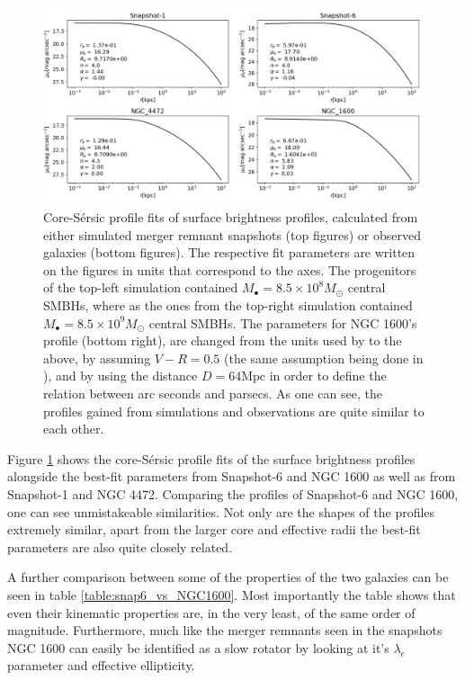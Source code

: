 \documentclass[english, oneside]{HYgradu}
\begin{document}
\begin{figure}[h]
	\centering
	\includegraphics[width=\textwidth]{core_sersic_fits_obs_and_sim.png}
	\caption{Core-Sérsic profile fits of surface brightness profiles, calculated from either simulated merger remnant snapshots (top figures) or observed galaxies (bottom figures). The respective fit parameters are written on the figures in units that correspond to the axes. The progenitors of the top-left simulation contained $M_\bullet = 8.5 \times 10^8 M_\odot$ central SMBHs, where as the ones from the top-right simulation contained $M_\bullet = 8.5 \times 10^9 M_\odot$ central SMBHs. The parameters for NGC 1600's profile (bottom right), are changed from the units used by \cite{Thomas2016} to the above, by assuming $V - R = 0.5$ (the same assumption being done in \cite{Lauer2007}), and by using the distance $D = 64 \mathrm{Mpc}$ \citep{Thomas2016} in order to define the relation between arc seconds and parsecs. As one can see, the profiles gained from simulations and observations are quite similar to each other.}
	\label{figure:coresersic_sim_obs}
\end{figure}

Figure \ref{figure:coresersic_sim_obs} shows the core-Sérsic profile fits of the surface brightness profiles alongside the best-fit parameters from Snapshot-6 and NGC 1600 as well as from Snapshot-1 and NGC 4472. Comparing the profiles of Snapshot-6 and NGC 1600, one can see unmistakeable similarities. Not only are the shapes of the profiles extremely similar, apart from the larger core and effective radii the best-fit parameters are also quite closely related.

A further comparison between some of the properties of the two galaxies can be seen in table \ref{table:snap6_vs_NGC1600}. Most importantly the table shows that even their kinematic properties are, in the very least, of the same order of magnitude. Furthermore, much like the merger remnants seen in the snapshots NGC 1600 can easily be identified as a slow rotator by looking at it's $\lambda_e$ parameter and effective ellipticity.
\end{document}
